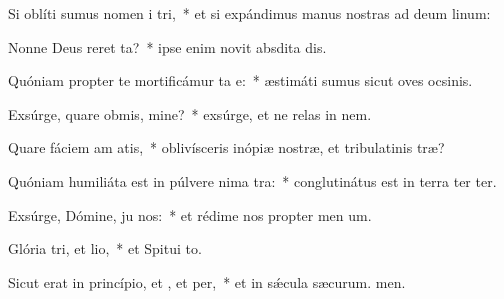 \item Si oblíti sumus nomen i tri,~* et si expándimus manus nostras ad deum linum:
\item Nonne Deus reret ta?~* ipse enim novit absdita dis.
\item Quóniam propter te mortificámur ta e:~* æstimáti sumus sicut oves ocsinis.
\item Exsúrge, quare obmis, mine?~* exsúrge, et ne relas in nem.
\item Quare fáciem am atis,~* oblivísceris inópiæ nostræ, et tribulatinis træ?
\item Quóniam humiliáta est in púlvere nima tra:~* conglutinátus est in terra ter ter.
\item Exsúrge, Dómine, ju nos:~* et rédime nos propter men um.
\item Glória tri, et lio,~* et Spitui to.
\item Sicut erat in princípio, et , et per,~* et in sǽcula sæcurum. men.
